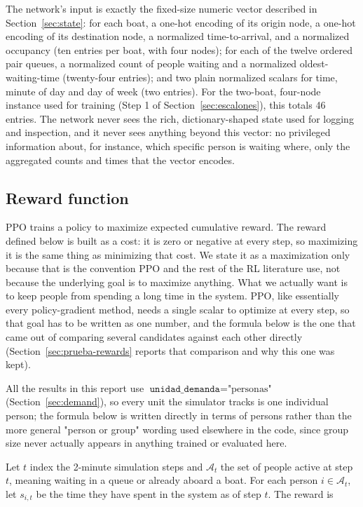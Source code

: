 \documentclass[11pt,a4paper]{article}
\begin{document}
The network's input is exactly the fixed-size numeric vector described in Section~\ref{sec:state}: for each boat, a one-hot encoding of its origin node, a one-hot encoding of its destination node, a normalized time-to-arrival, and a normalized occupancy (ten entries per boat, with four nodes); for each of the twelve ordered pair queues, a normalized count of people waiting and a normalized oldest-waiting-time (twenty-four entries); and two plain normalized scalars for time, minute of day and day of week (two entries). For the two-boat, four-node instance used for training (Step 1 of Section~\ref{sec:escalones}), this totals 46 entries. The network never sees the rich, dictionary-shaped state used for logging and inspection, and it never sees anything beyond this vector: no privileged information about, for instance, which specific person is waiting where, only the aggregated counts and times that the vector encodes.

\subsection{Reward function}
\label{sec:reward-agent}

PPO trains a policy to maximize expected cumulative reward. The reward defined below is built as a cost: it is zero or negative at every step, so maximizing it is the same thing as minimizing that cost. We state it as a maximization only because that is the convention PPO and the rest of the RL literature use, not because the underlying goal is to maximize anything. What we actually want is to keep people from spending a long time in the system. PPO, like essentially every policy-gradient method, needs a single scalar to optimize at every step, so that goal has to be written as one number, and the formula below is the one that came out of comparing several candidates against each other directly (Section~\ref{sec:prueba-rewards} reports that comparison and why this one was kept).

All the results in this report use $\texttt{unidad\_demanda} = \text{"personas"}$ (Section~\ref{sec:demand}), so every unit the simulator tracks is one individual person; the formula below is written directly in terms of persons rather than the more general "person or group" wording used elsewhere in the code, since group size never actually appears in anything trained or evaluated here.

Let $t$ index the 2-minute simulation steps and $\mathcal{A}_t$ the set of people active at step $t$, meaning waiting in a queue or already aboard a boat. For each person $i \in \mathcal{A}_t$, let $s_{i,t}$ be the time they have spent in the system as of step $t$. The reward is
\end{document}
